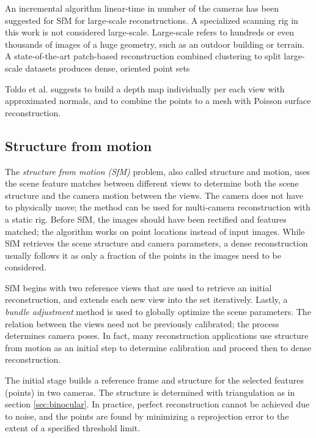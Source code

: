 An incremental algorithm linear-time in number of the cameras has been suggested for SfM for large-scale reconstructions. \cite{wu2013towards}
A specialized scanning rig in this work is not considered large-scale.
Large-scale refers to hundreds or even thousands of images of a huge geometry, such as an outdoor building or terrain.
A state-of-the-art patch-based reconstruction combined clustering to split large-scale datasets produces dense, oriented point sets \cite{furukawa2012patch,furukawa2010accurate}

Toldo et al. suggests to build a depth map individually per each view with approximated normals, and to combine the points to a mesh with Poisson surface reconstruction. \cite{toldo2013accurate,toldo2013towards}


\subsection{Structure from motion} \label{sec:sfm} %


The \emph{structure from motion (SfM)} problem, also called structure and motion, uses the scene feature matches between different views to determine both the scene structure and the camera motion between the views.
\cite{snavely2006photo,fitzgibbon1998automatic} 
The camera does not have to physically move; the method can be used for multi-camera reconstruction with a static rig.
Before SfM, the images should have been rectified and features matched; the algorithm works on point locations instead of input images.
While SfM retrieves the scene structure and camera parameters, a dense reconstruction usually follows it as only a fraction of the points in the images need to be considered.

SfM begins with two reference views that are used to retrieve an initial reconstruction, and extends each new view into the set iteratively.
Lastly, a \emph{bundle adjustment} method is used to globally optimize the scene parameters. \cite{triggs2000bundle}
The relation between the views need not be previously calibrated; the process determines camera poses.
In fact, many reconstruction applications use structure from motion as an initial step to determine calibration and proceed then to dense reconstruction.

The initial stage builds a reference frame and structure for the selected features (points) in two cameras.
The structure is determined with triangulation as in section \ref{sec:binocular}.
In practice, perfect reconstruction cannot be achieved due to noise, and the points are found by minimizing a reprojection error to the extent of a specified threshold limit.

